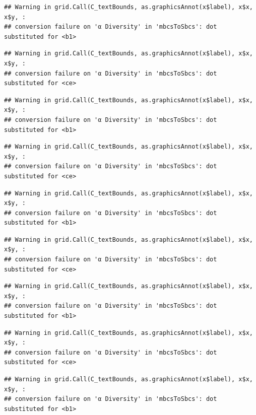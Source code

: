 \documentclass[
]{article}
\begin{document}
\begin{verbatim}
## Warning in grid.Call(C_textBounds, as.graphicsAnnot(x$label), x$x, x$y, :
## conversion failure on 'α Diversity' in 'mbcsToSbcs': dot substituted for <b1>
\end{verbatim}

\begin{verbatim}
## Warning in grid.Call(C_textBounds, as.graphicsAnnot(x$label), x$x, x$y, :
## conversion failure on 'α Diversity' in 'mbcsToSbcs': dot substituted for <ce>
\end{verbatim}

\begin{verbatim}
## Warning in grid.Call(C_textBounds, as.graphicsAnnot(x$label), x$x, x$y, :
## conversion failure on 'α Diversity' in 'mbcsToSbcs': dot substituted for <b1>
\end{verbatim}

\begin{verbatim}
## Warning in grid.Call(C_textBounds, as.graphicsAnnot(x$label), x$x, x$y, :
## conversion failure on 'α Diversity' in 'mbcsToSbcs': dot substituted for <ce>
\end{verbatim}

\begin{verbatim}
## Warning in grid.Call(C_textBounds, as.graphicsAnnot(x$label), x$x, x$y, :
## conversion failure on 'α Diversity' in 'mbcsToSbcs': dot substituted for <b1>
\end{verbatim}

\begin{verbatim}
## Warning in grid.Call(C_textBounds, as.graphicsAnnot(x$label), x$x, x$y, :
## conversion failure on 'α Diversity' in 'mbcsToSbcs': dot substituted for <ce>
\end{verbatim}

\begin{verbatim}
## Warning in grid.Call(C_textBounds, as.graphicsAnnot(x$label), x$x, x$y, :
## conversion failure on 'α Diversity' in 'mbcsToSbcs': dot substituted for <b1>
\end{verbatim}

\begin{verbatim}
## Warning in grid.Call(C_textBounds, as.graphicsAnnot(x$label), x$x, x$y, :
## conversion failure on 'α Diversity' in 'mbcsToSbcs': dot substituted for <ce>
\end{verbatim}

\begin{verbatim}
## Warning in grid.Call(C_textBounds, as.graphicsAnnot(x$label), x$x, x$y, :
## conversion failure on 'α Diversity' in 'mbcsToSbcs': dot substituted for <b1>
\end{verbatim}
\end{document}
